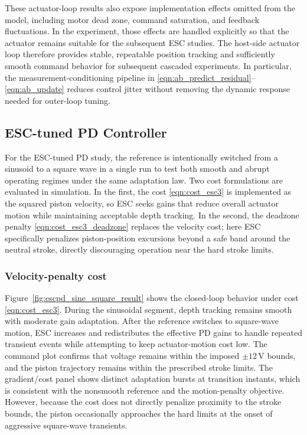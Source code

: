 ﻿\documentclass[subscriptcorrection,upint,varvw,barcolor=Goldenrod3,mathalfa=cal=euler,balance,hyphenate,french,pdf-a]{asmejour}
\begin{document}
These actuator-loop results also expose implementation effects omitted from the model, including motor dead zone, command saturation, and feedback fluctuations. In the experiment, those effects are handled explicitly so that the actuator remains suitable for the subsequent ESC studies.
The host-side actuator loop therefore provides stable, repeatable position tracking and sufficiently smooth command behavior for subsequent cascaded experiments. In particular, the measurement-conditioning pipeline in \eqref{eqn:ab_predict_residual}--\eqref{eqn:ab_update} reduces control jitter without removing the dynamic response needed for outer-loop tuning.

\subsection{ESC-tuned PD Controller}
For the ESC-tuned PD study, the reference is intentionally switched from a sinusoid to a square wave in a single run to test both smooth and abrupt operating regimes under the same adaptation law.  Two cost formulations are evaluated in simulation.  In the first, the cost \eqref{eqn:cost_esc3} is implemented as the squared piston velocity, so ESC seeks gains that reduce overall actuator motion while maintaining acceptable depth tracking.  In the second, the deadzone penalty \eqref{eqn:cost_esc3_deadzone} replaces the velocity cost; here ESC specifically penalizes piston-position excursions beyond a safe band around the neutral stroke, directly discouraging operation near the hard stroke limits.

\subsubsection{Velocity-penalty cost}
Figure~\ref{fig:escpd_sine_square_result} shows the closed-loop behavior under cost \eqref{eqn:cost_esc3}. During the sinusoidal segment, depth tracking remains smooth with moderate gain adaptation. After the reference switches to square-wave motion, ESC increases and redistributes the effective PD gains to handle repeated transient events while attempting to keep actuator-motion cost low. The command plot confirms that voltage remains within the imposed $\pm 12$\,V bounds, and the piston trajectory remains within the prescribed stroke limits. The gradient/cost panel shows distinct adaptation bursts at transition instants, which is consistent with the nonsmooth reference and the motion-penalty objective.  However, because the cost does not directly penalize proximity to the stroke bounds, the piston occasionally approaches the hard limits at the onset of aggressive square-wave transients.
\end{document}

